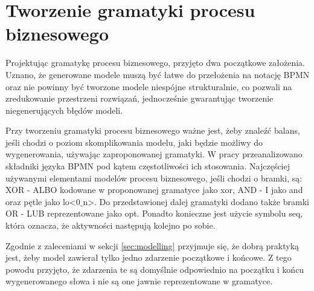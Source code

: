 \section{Tworzenie gramatyki procesu biznesowego}
\label{sec:businessGrammarCreation}
Projektując gramatykę procesu biznesowego, przyjęto dwa początkowe założenia. Uznano, że generowane modele muszą być łatwe do przełożenia na notację BPMN oraz nie powinny być tworzone modele niespójne strukturalnie, co pozwali na zredukowanie przestrzeni rozwiązań, jednocześnie gwarantując tworzenie niegenerujących błędów modeli.

Przy tworzeniu gramatyki procesu biznesowego ważne jest, żeby znaleźć balans, jeśli chodzi o poziom skomplikowania modelu, jaki będzie możliwy do wygenerowania, używając zaproponowanej gramatyki.  W pracy \cite{10.1007/978-3-540-69534-9_35} przeanalizowano składniki języka BPMN pod kątem częstotliwości ich stosowania. Najczęściej używanymi elementami modelów procesu biznesowego, jeśli chodzi o bramki, są: XOR - ALBO kodowane w proponowanej gramatyce jako xor, AND - I jako and oraz pętle jako lo<0$\_$n>. Do przedstawionej dalej gramatyki dodano także bramki OR - LUB reprezentowane jako opt. Ponadto konieczne jest użycie symbolu seq, która oznacza, że aktywności następują kolejno po sobie.

Zgodnie z zaleceniami w sekcji \ref{sec:modelling} przyjmuje się, że dobrą praktyką jest, żeby model zawierał tylko jedno zdarzenie początkowe i końcowe. Z tego powodu przyjęto, że zdarzenia te są domyślnie odpowiednio na początku i końcu wygenerowanego słowa i nie są one jawnie reprezentowane w gramatyce.

